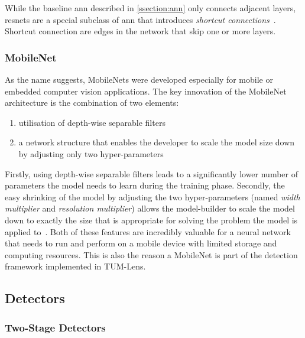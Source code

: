 \documentclass[
			   fontsize=11pt,
               paper=a4,
               bibliography=totoc,
               idxtotoc,
               headsepline,
               footsepline,
               footinclude=false,
               BCOR=12mm,
               DIV=13,
               openany,   %
               ]
               {scrbook}
\begin{document}
While the baseline \gls{ann} described in \autoref{ssection:ann} only connects adjacent layers, \glspl{resnet} are a special subclass of \gls{ann} that introduces \textit{shortcut connections}~\cite{backboneResNet}. Shortcut connection are edges in the network that skip one or more layers.

\subsubsection{MobileNet} \label{sssec:mobilenet}
As the name suggests, MobileNets were developed especially for mobile or embedded computer vision applications. The key innovation of the MobileNet architecture is the combination of two elements:
\begin{enumerate}
	\item utilisation of depth-wise separable filters~\cite{depthSep}
	\item a network structure that enables the developer to scale the model size down by adjusting only two hyper-parameters
\end{enumerate}

\noindent Firstly, using depth-wise separable filters leads to a significantly lower number of parameters the model needs to learn during the training phase. Secondly, the easy shrinking of the model by adjusting the two hyper-parameters (named \textit{width multiplier} and \textit{resolution multiplier}) allows the model-builder to scale the model down to exactly the size that is appropriate for solving the problem the model is applied to~\cite{backboneMobileNet}. Both of these features are incredibly valuable for a neural network that needs to run and perform on a mobile device with limited storage and computing resources. This is also the reason a MobileNet is part of the detection framework implemented in TUM-Lens.

\subsection{Detectors}


\subsubsection{Two-Stage Detectors}
\end{document}
